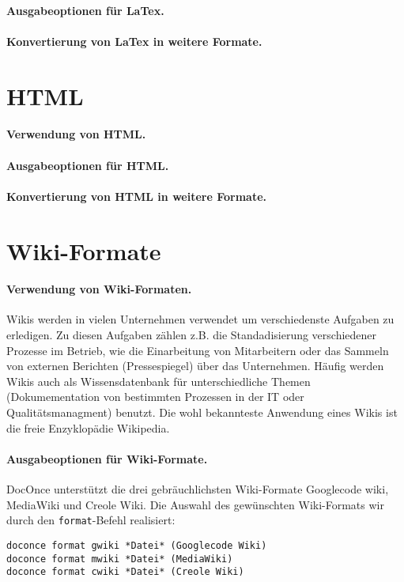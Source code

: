 \documentclass[%
oneside,                 %
final,                   %
chapterprefix=true,      %
open=right,              %
10pt]{book}
\begin{document}
\paragraph{ Ausgabeoptionen für LaTex.}
\paragraph{ Konvertierung von LaTex in weitere Formate.}
\section{HTML}
\paragraph{ Verwendung von HTML.}
\paragraph{ Ausgabeoptionen für HTML.}
\paragraph{ Konvertierung von HTML in weitere Formate.}
\section{Wiki-Formate}
\paragraph{ Verwendung von Wiki-Formaten.}
Wikis werden in vielen Unternehmen verwendet um verschiedenste Aufgaben zu erledigen. Zu diesen Aufgaben zählen z.B. die Standadisierung verschiedener Prozesse im Betrieb, wie die Einarbeitung von Mitarbeitern oder das Sammeln von externen Berichten (Pressespiegel) über das Unternehmen. Häufig werden Wikis auch als Wissensdatenbank für unterschiedliche Themen (Dokumementation von bestimmten Prozessen in der IT oder Qualitätsmanagment) benutzt. Die wohl bekannteste Anwendung eines Wikis ist die freie Enzyklopädie Wikipedia.
\paragraph{ Ausgabeoptionen für Wiki-Formate.}
DocOnce unterstützt die drei gebräuchlichsten Wiki-Formate Googlecode wiki, MediaWiki und Creole Wiki. Die Auswahl des gewünschten Wiki-Formats wir durch den \texttt{format}-Befehl realisiert:

\begin{verbatim}
doconce format gwiki *Datei* (Googlecode Wiki)
doconce format mwiki *Datei* (MediaWiki)
doconce format cwiki *Datei* (Creole Wiki)
\end{verbatim}
\end{document}
